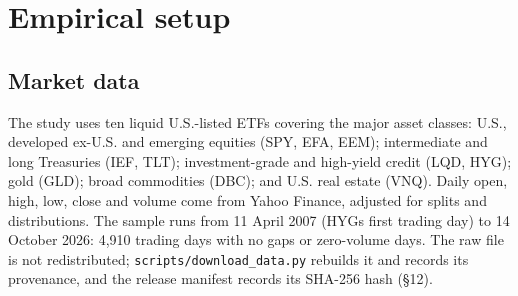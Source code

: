 \documentclass[11pt]{article}
\begin{document}
\section{Empirical setup}\label{s4}

\subsection{Market data}\label{market-data}

The study uses ten liquid U.S.-listed ETFs covering the major asset classes: U.S., developed ex-U.S. and emerging equities (SPY, EFA, EEM); intermediate and long Treasuries (IEF, TLT); investment-grade and high-yield credit (LQD, HYG); gold (GLD); broad commodities (DBC); and U.S. real estate (VNQ). Daily open, high, low, close and volume come from Yahoo Finance, adjusted for splits and distributions. The sample runs from 11 April 2007 (HYG\textquotesingle s first trading day) to 14 October 2026: 4,910 trading days with no gaps or zero-volume days. The raw file is not redistributed; \texttt{scripts/download\_data.py} rebuilds it and records its provenance, and the release manifest records its SHA-256 hash (\S{}12).
\end{document}
